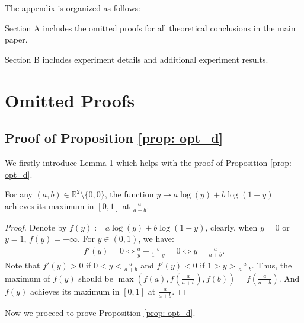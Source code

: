 The appendix is organized as follows:
\squishlist
    \item Section A includes the omitted proofs for all theoretical conclusions in the main paper.
    \item Section B includes experiment details and additional experiment results.
\squishend

\section{Omitted Proofs}

\subsection{Proof of Proposition \ref{prop: opt_d}}\label{app:p1}
We firstly introduce Lemma 1 which helps with the proof of Proposition \ref{prop: opt_d}.

\begin{lemma}\label{lm:basic}
For any $(a,b)\in \mathbb{R}^2\setminus \{0, 0\}$, the function $y\rightarrow a\log(y)+b\log(1-y)$ achieves its maximum in $[0,1]$ at $\frac{a}{a+b}$.
\end{lemma}
\begin{proof}
Denote by $f(y):=a\log(y)+b\log(1-y)$, clearly, when $y=0$ or $y=1$, $f(y)=-\infty$. For $y\in (0,1)$, we have:
\begin{align}
    f'(y)=0\Longleftrightarrow \frac{a}{y}-\frac{b}{1-y}=0 \Longleftrightarrow y=\frac{a}{a+b}.
\end{align}
Note that $f'(y)>0$ if $0<y<\frac{a}{a+b}$ and $f'(y)<0$ if $1>y>\frac{a}{a+b}$. Thus, the maximum of $f(y)$ should be $\max(f(a), f(\frac{a}{a+b}), f(b))=f(\frac{a}{a+b})$. And $f(y)$ achieves its maximum in $[0,1]$ at $\frac{a}{a+b}$.
\end{proof}
Now we proceed to prove Proposition \ref{prop: opt_d}. 
